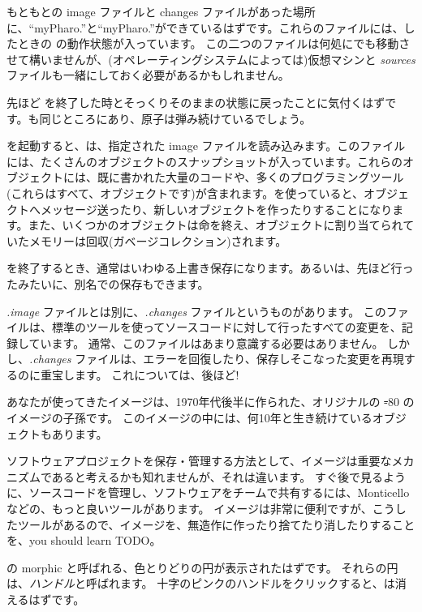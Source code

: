 \documentclass[a4paper,10pt,twoside]{book}
\begin{document}
もともとの image ファイルと changes ファイルがあった場所に、``myPharo.''と``myPharo.''ができているはずです。これらのファイルには、したときの \pharo の動作状態が入っています。
この二つのファイルは何処にでも移動させて構いませんが、(オペレーティングシステムによっては)仮想マシンと \emph{sources} ファイルも一緒にしておく必要があるかもしれません。


先ほど \pharo を終了した時とそっくりそのままの状態に戻ったことに気付くはずです。\bam も同じところにあり、原子は弾み続けているでしょう。

\pharo を起動すると、\pharo {}は、指定された image ファイルを読み込みます。このファイルには、たくさんのオブジェクトのスナップショットが入っています。これらのオブジェクトには、既に書かれた大量のコードや、多くのプログラミングツール(これらはすべて、オブジェクトです)が含まれます。\pharo を使っていると、オブジェクトへメッセージ送ったり、新しいオブジェクトを作ったりすることになります。また、いくつかのオブジェクトは命を終え、オブジェクトに割り当てられていたメモリーは回収(\ie ガベージコレクション)されます。

\pharo を終了するとき、通常はいわゆる上書き保存になります。あるいは、先ほど行ったみたいに、別名での保存もできます。

\emph{.image} ファイルとは別に、\emph{.changes} ファイルというものがあります。
このファイルは、標準のツールを使ってソースコードに対して行ったすべての変更を、記録しています。
通常、このファイルはあまり意識する必要はありません。
しかし、\emph{.changes} ファイルは、エラーを回復したり、保存しそこなった変更を再現するのに重宝します。
これについては、後ほど!

あなたが使ってきたイメージは、1970年代後半に作られた、オリジナルの \st-80 のイメージの子孫です。
このイメージの中には、何10年と生き続けているオブジェクトもあります。

ソフトウェアプロジェクトを保存・管理する方法として、イメージは重要なメカニズムであると考えるかも知れませんが、それは違います。
すぐ後で見るように、ソースコードを管理し、ソフトウェアをチームで共有するには、Monticello などの、もっと良いツールがあります。
イメージは非常に便利ですが、こうしたツールがあるので、イメージを、無造作に作ったり捨てたり消したりすることを、you should learn TODO。

\bam の morphic  と呼ばれる、色とりどりの円が表示されたはずです。
それらの円は、\emph{ハンドル}と呼ばれます。
十字のピンクのハンドルをクリックすると、\bam は消えるはずです。
\end{document}
